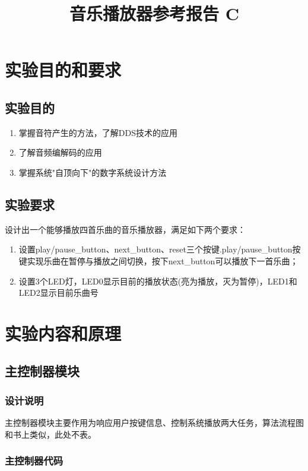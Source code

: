\documentclass{ctexart}
\title{音乐播放器参考报告 C}
\author{}
\date{}
\begin{document}
    \maketitle
    

    \section{实验目的和要求}
        \subsection{实验目的}
        \begin{enumerate}
            \item 掌握音符产生的方法，了解DDS技术的应用
            \item 了解音频编解码的应用
            \item 掌握系统"自顶向下"的数字系统设计方法
        \end{enumerate}

        \subsection{实验要求}
        设计出一个能够播放四首乐曲的音乐播放器，满足如下两个要求：
        \begin{enumerate}
            \item 设置play/pause_button、next_button、reset三个按键.play/pause_button按键实现乐曲在暂停与播放之间切换，按下next_button可以播放下一首乐曲；
            \item 设置3个LED灯，LED0显示目前的播放状态(亮为播放，灭为暂停)，LED1和LED2显示目前乐曲号
        \end{enumerate}

    \section{实验内容和原理}
        \subsection{主控制器模块}
            \subsubsection{设计说明}
            主控制器模块主要作用为响应用户按键信息、控制系统播放两大任务，算法流程图和书上类似，此处不表。
            \subsubsection{主控制器代码}
            
        
\end{document}
